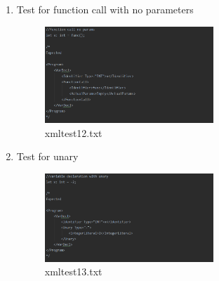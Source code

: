 \documentclass{article}
\begin{document}
\begin{enumerate}
					\item Test for function call with no parameters
					\begin{figure}[H]
					\centering
			 			\includegraphics[width=0.6\textwidth]{xmltest12.png}
			 			 \centering
			  			\caption{xmltest12.txt}
			  			\label{fig:xmltest12}
					\end{figure}
					
					\item Test for unary
					\begin{figure}[H]
					\centering
			 			\includegraphics[width=0.6\textwidth]{xmltest13.png}
			 			\centering
			  			\caption{xmltest13.txt}
			  			\label{fig:xmltest13}
					\end{figure}

					
				\end{enumerate}
		
		\pagebreak
		
		\nocite{*}



			
		
			
					
			
\end{document}
